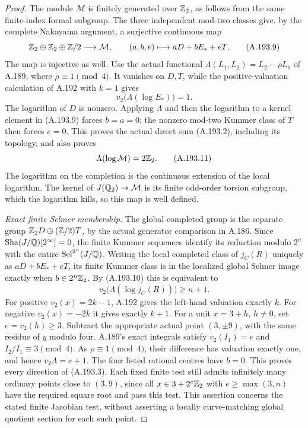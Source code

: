 \begin{proof}
The module \(\mathcal M\) is finitely generated over \(\mathbb Z_2\),
as follows from the same finite-index formal subgroup.
The three independent mod-two classes give, by the complete
Nakayama argument, a surjective continuous map
\[
 \mathbb Z_2\oplus\mathbb Z_2\oplus\mathbb Z/2\longrightarrow\mathcal M,
             \qquad (a,b,e)\longmapsto aD+bE_*+eT.
\tag{A.193.9}
\]
The map is injective as well.  Use the actual functional
\(\Lambda(L_1,L_2)=L_2-\rho L_1\) of A.189,
where \(\rho\equiv1\pmod4\).  It vanishes on \(D,T\),
while the positive-valuation calculation of A.192 with \(k=1\)
gives
\[
                   v_2\bigl(\Lambda(\log E_*)\bigr)=1.
\tag{A.193.10}
\]
The logarithm of \(D\) is nonzero.  Applying \(\Lambda\)
and then the logarithm to a kernel element in (A.193.9)
forces \(b=a=0\); the nonzero mod-two Kummer class of
\(T\) then forces \(e=0\).  This proves the actual direct
sum (A.193.2), including its topology, and also proves
\[
                  \Lambda(\log\mathcal M)=2\mathbb Z_2.
\tag{A.193.11}
\]
The logarithm on the completion is the continuous extension
of the local logarithm.  The kernel of
\(J(\mathbb Q_2)\to\mathcal M\) is its finite odd-order torsion
subgroup, which the logarithm kills, so this map is well defined.

\emph{Exact finite Selmer membership.}
The global completed group is the separate group
\(\mathbb Z_2D\oplus(\mathbb Z/2)T\), by the actual generator comparison
in A.186.  Since \(\operatorname{Sha}(J/\mathbb Q)[2^\infty]=0\), the finite
Kummer sequences identify its reduction modulo \(2^n\)
with the entire \(\operatorname{Sel}^{2^n}(J/\mathbb Q)\).
Writing the local completed class of \(j_C(R)\) uniquely as
\(aD+bE_*+eT\), its finite Kummer class is in the localized
global Selmer image exactly when \(b\in2^n\mathbb Z_2\).
By (A.193.10) this is equivalent to
\[
                 v_2\bigl(\Lambda(\log j_C(R))\bigr)
                                      \geq n+1.
\tag{A.193.12}
\]
For positive \(v_2(x)=2k-1\), A.192 gives the left-hand
valuation exactly \(k\).  For negative \(v_2(x)=-2k\)
it gives exactly \(k+1\).
For a unit \(x=3+h\), \(h\ne0\), set \(e=v_2(h)\geq3\).
Subtract the appropriate actual point \((3,\pm9)\), with
the same residue of \(y\) modulo four.  A.189's exact
integrals satisfy \(v_2(I_1)=e\) and
\(I_2/I_1\equiv3\pmod4\).  As \(\rho\equiv1\pmod4\),
their difference has valuation exactly one, and hence
\(v_2\Lambda=e+1\).  The four listed rational centres have
\(b=0\).  This proves every direction of (A.193.3).
Each fixed finite test still admits infinitely many ordinary
points close to \((3,9)\), since all \(x\in3+2^e\mathbb Z_2\)
with \(e\geq\max(3,n)\) have the required square root and
pass this test.  This assertion concerns the stated finite
Jacobian test, without asserting a locally curve-matching
global quotient section for each such point.


\end{proof}
